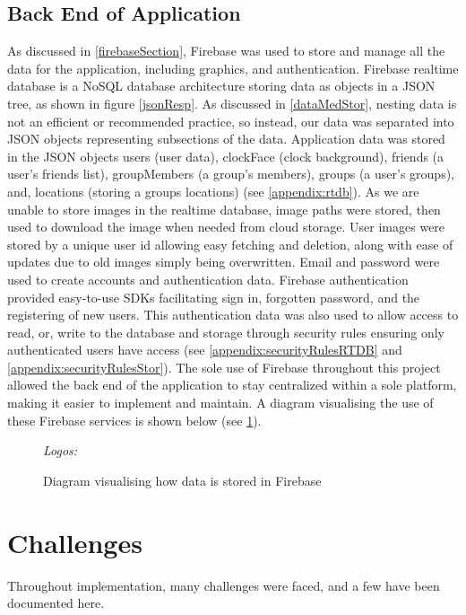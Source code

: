 \subsection{Back End of Application}
As discussed in \ref{firebaseSection}, Firebase was used to store and manage all the data for the application, including graphics, and authentication. Firebase realtime database is a NoSQL database architecture storing data as objects in a JSON tree, as shown in figure \ref{jsonResp}. As discussed in \ref{dataMedStor}, nesting data is not an efficient or recommended practice, so instead, our data was separated into JSON objects representing subsections of the data. Application data was stored in the JSON objects users (user data), clockFace (clock background), friends (a user's friends list), groupMembers (a group's members), groups (a user's groups), and, locations (storing a groups locations) (see \ref{appendix:rtdb}). As we are unable to store images in the realtime database, image paths were stored, then used to download the image when needed from cloud storage. User images were stored by a unique user id allowing easy fetching and deletion, along with ease of updates due to old images simply being overwritten. Email and password were used to create accounts and authentication data. Firebase authentication provided easy-to-use SDKs facilitating sign in, forgotten password, and the registering of new users. This authentication data was also used to allow access to read, or, write to the database and storage through security rules ensuring only authenticated users have access (see \ref{appendix:securityRulesRTDB} and \ref{appendix:securityRulesStor}). The sole use of Firebase throughout this project allowed the back end of the application to stay centralized within a sole platform, making it easier to implement and maintain. A diagram visualising the use of these Firebase services is shown below (see \ref{fig:firebaseDiag}).
\begin{figure}[!htbp]
    \centering
    \begin{subfigure}[b]{\textwidth}
    \end{subfigure}
    \caption{Diagram visualising how data is stored in Firebase} \small\textit{{Logos: \cite{storImg, rtdbImg, authImg}}}
    \label{fig:firebaseDiag}
\end{figure}
\FloatBarrier
\section{Challenges}
Throughout implementation, many challenges were faced, and a few have been documented here.
